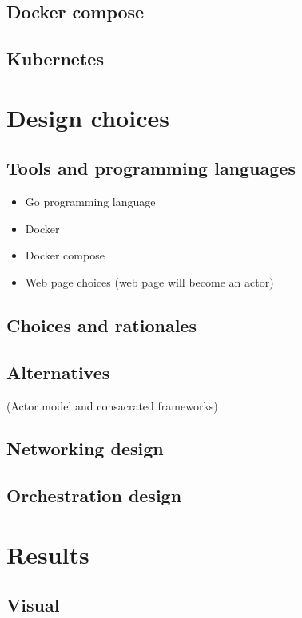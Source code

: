 \documentclass[conference]{IEEEtran}
\begin{document}
\subsection{Docker compose}

\subsection{Kubernetes}

\section{Design choices}

\subsection{Tools and programming languages}
\begin{itemize}
\item Go programming language
\item Docker
\item Docker compose
\item Web page choices (web page will become an actor)
\end{itemize}

\subsection{Choices and rationales}

\subsection{Alternatives}
(Actor model and consacrated frameworks)

\subsection{Networking design}

\subsection{Orchestration design}

\section{Results}

\subsection{Visual}
\end{document}
